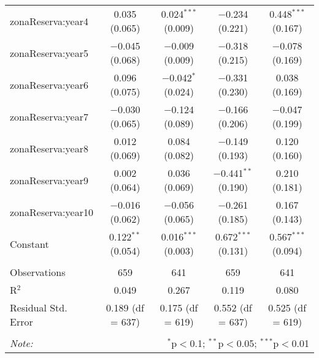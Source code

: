 \begin{table}[!htbp]
\begin{tabular}{@{\extracolsep{1pt}}lcccc}
  zonaReserva:year4 & 0.035 (0.065) & 0.024$^{***}$ (0.009) & $-$0.234 (0.221) & 0.448$^{***}$ (0.167) \\ 
  zonaReserva:year5 & $-$0.045 (0.068) & $-$0.009 (0.009) & $-$0.318 (0.215) & $-$0.078 (0.169) \\ 
  zonaReserva:year6 & 0.096 (0.075) & $-$0.042$^{*}$ (0.024) & $-$0.331 (0.230) & 0.038 (0.169) \\ 
  zonaReserva:year7 & $-$0.030 (0.065) & $-$0.124 (0.089) & $-$0.166 (0.206) & $-$0.047 (0.199) \\ 
  zonaReserva:year8 & 0.012 (0.069) & 0.084 (0.082) & $-$0.149 (0.193) & 0.120 (0.160) \\ 
  zonaReserva:year9 & 0.002 (0.064) & 0.036 (0.069) & $-$0.441$^{**}$ (0.190) & 0.210 (0.181) \\ 
  zonaReserva:year10 & $-$0.016 (0.062) & $-$0.056 (0.065) & $-$0.261 (0.185) & 0.167 (0.143) \\ 
  Constant & 0.122$^{**}$ (0.054) & 0.016$^{***}$ (0.003) & 0.672$^{***}$ (0.131) & 0.567$^{***}$ (0.094) \\ 
 \hline \\[-1.8ex] 
Observations & 659 & 641 & 659 & 641 \\ 
R$^{2}$ & 0.049 & 0.267 & 0.119 & 0.080 \\ 
Residual Std. Error & 0.189 (df = 637) & 0.175 (df = 619) & 0.552 (df = 637) & 0.525 (df = 619) \\ 
\hline 
\hline \\[-1.8ex] 
\textit{Note:}  & \multicolumn{4}{r}{$^{*}$p$<$0.1; $^{**}$p$<$0.05; $^{***}$p$<$0.01} \\ 
\end{tabular} 
\end{table} 
